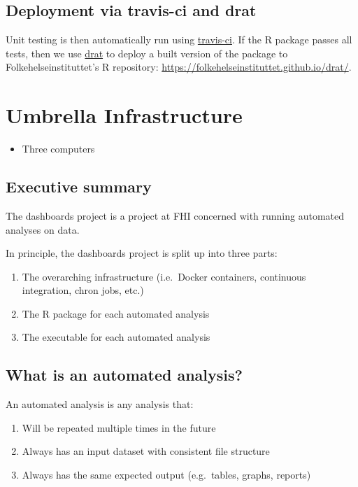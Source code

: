 \documentclass[12pt,]{article}
\providecommand{\tightlist}{%
  \setlength{\itemsep}{0pt}\setlength{\parskip}{0pt}}
\theoremstyle{definition}
\theoremstyle{definition}
\theoremstyle{definition}
\theoremstyle{remark}
\begin{document}
\subsection{Deployment via travis-ci and
drat}\label{deployment-via-travis-ci-and-drat}

Unit testing is then automatically run using
\href{http://r-pkgs.had.co.nz/check.html\#travis}{travis-ci}. If the R
package passes all tests, then we use
\href{https://github.com/eddelbuettel/drat}{drat} to deploy a built
version of the package to Folkehelseinstituttet's R repository:
\url{https://folkehelseinstituttet.github.io/drat/}.

\section{Umbrella Infrastructure}\label{umbrella-infrastructure}

\begin{itemize}
\tightlist
\item
  Three computers
\end{itemize}

\subsection{Executive summary}\label{executive-summary-1}

The dashboards project is a project at FHI concerned with running
automated analyses on data.

In principle, the dashboards project is split up into three parts:

\begin{enumerate}
\def\labelenumi{\arabic{enumi}.}
\tightlist
\item
  The overarching infrastructure (i.e.~Docker containers, continuous
  integration, chron jobs, etc.)
\item
  The R package for each automated analysis
\item
  The executable for each automated analysis
\end{enumerate}

\subsection{What is an automated
analysis?}\label{what-is-an-automated-analysis-1}

An automated analysis is any analysis that:

\begin{enumerate}
\def\labelenumi{\arabic{enumi}.}
\tightlist
\item
  Will be repeated multiple times in the future
\item
  Always has an input dataset with consistent file structure
\item
  Always has the same expected output (e.g.~tables, graphs, reports)
\end{enumerate}
\end{document}
